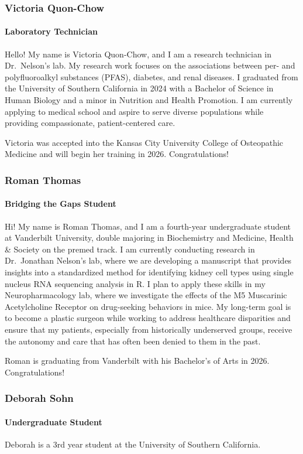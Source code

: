 \documentclass[
]{article}
\begin{document}
\subsubsection{Victoria Quon-Chow}\label{victoria-quon-chow}

\paragraph{Laboratory Technician}\label{laboratory-technician}

Hello! My name is Victoria Quon-Chow, and I am a research technician in
Dr.~Nelson's lab. My research work focuses on the associations between
per- and polyfluoroalkyl substances (PFAS), diabetes, and renal
diseases. I graduated from the University of Southern California in 2024
with a Bachelor of Science in Human Biology and a minor in Nutrition and
Health Promotion. I am currently applying to medical school and aspire
to serve diverse populations while providing compassionate,
patient-centered care.

Victoria was accepted into the Kansas City University College of
Osteopathic Medicine and will begin her training in 2026.
Congratulations!

\subsubsection{Roman Thomas}\label{roman-thomas}

\paragraph{Bridging the Gaps Student}\label{bridging-the-gaps-student-1}

Hi! My name is Roman Thomas, and I am a fourth-year undergraduate
student at Vanderbilt University, double majoring in Biochemistry and
Medicine, Health \& Society on the premed track. I am currently
conducting research in Dr.~Jonathan Nelson's lab, where we are
developing a manuscript that provides insights into a standardized
method for identifying kidney cell types using single nucleus RNA
sequencing analysis in R. I plan to apply these skills in my
Neuropharmacology lab, where we investigate the effects of the M5
Muscarinic Acetylcholine Receptor on drug-seeking behaviors in mice. My
long-term goal is to become a plastic surgeon while working to address
healthcare disparities and ensure that my patients, especially from
historically underserved groups, receive the autonomy and care that has
often been denied to them in the past.

Roman is graduating from Vanderbilt with his Bachelor's of Arts in 2026.
Congratulations!

\subsubsection{Deborah Sohn}\label{deborah-sohn}

\paragraph{Undergraduate Student}\label{undergraduate-student-4}

Deborah is a 3rd year student at the University of Southern California.
\end{document}
